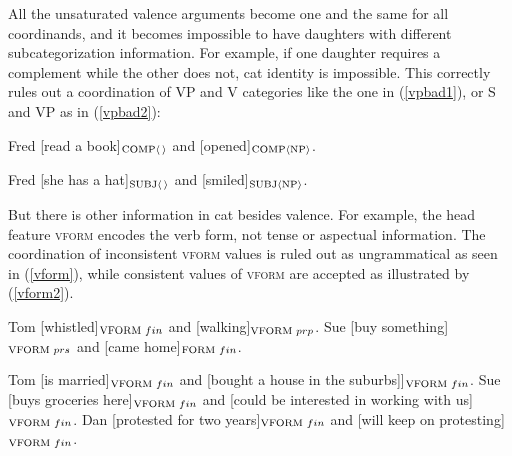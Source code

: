 \documentclass[output=paper]{langsci/langscibook}
\begin{document}
All the unsaturated valence arguments become one and the same for all coordinands, and it becomes impossible to have daughters with different subcategorization information. For example, if one daughter requires a complement while the other does not,
{\sc cat} identity  is impossible. This correctly rules out  a coordination of  VP and V categories
like the one in (\ref{vpbad1}), or S and VP as in (\ref{vpbad2}):

\begin{exe}
\ex
\begin{xlista}
\ex{*}Fred [read a book]$_{\textup{\scriptsize COMP} \langle \, \rangle}$  and [opened]$_{\textup{\scriptsize COMP}
 \langle \textup{\scriptsize NP} \rangle}$.\label{vpbad1}
 
 \ex{*}Fred [she has a hat]$_{\textup{\scriptsize SUBJ} \langle \, \rangle}$ and
 [smiled]$_{\textup{\scriptsize SUBJ} \langle \textup{\scriptsize NP} \rangle}$.\label{vpbad2}
\end{xlista}
\end{exe}

But there is other information in {\sc cat} besides valence. For example, the head feature  \textsc{vform}  encodes the verb form, not tense or aspectual information. The coordination of inconsistent \textsc{vform} values is   ruled out as ungrammatical as seen
 in (\ref{vform}), while  consistent values of \textsc{vform} are accepted  as illustrated by (\ref{vform2}).

\begin{exe}
\ex
\begin{xlista}
  \ex{*}Tom [whistled]$_{\textup{\scriptsize VFORM} \,\, fin}$ and
                   [walking]$_{\textup{\scriptsize VFORM} \,\, prp}$.
 \ex{*}Sue  [buy something]$_{\textup{\scriptsize VFORM} \,\, prs}$ and
 [came home]$_{\textup{\scriptsize FORM} \,\, fin}$.
 \end{xlista} \label{vform}
\end{exe}



\begin{exe}
\ex \begin{xlista}
  \ex Tom [is married]$_{\textup{\scriptsize VFORM} \,\, fin}$ and
                   [bought  a house in the suburbs]]$_{\textup{\scriptsize VFORM} \,\, fin}$.
   \ex Sue [buys groceries here]$_{\textup{\scriptsize VFORM} \,\, fin}$ and
                   [could be interested in working with us]$_{\textup{\scriptsize VFORM} \,\, fin}$.
   \ex Dan [protested for two years]$_{\textup{\scriptsize VFORM} \,\, fin}$ and
                   [will keep on protesting]$_{\textup{\scriptsize VFORM} \,\, fin}$.
\end{xlista}\label{vform2}
\end{exe}
\end{document}
